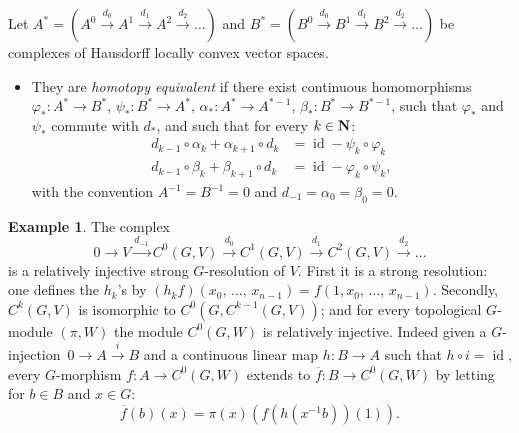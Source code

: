 \documentclass[11pt]{article}
\theoremstyle{definition}
\newtheorem{exam}[theo]{Example}
\numberwithin{equation}{section}
\numberwithin{figure}{section}
\numberwithin{table}{section}
\DeclareMathOperator{\idm}{id}
\begin{document}
Let $A^* = (A^0 \stackrel{d_0}{\to} A^1 \stackrel{d_1}{\to} A^2 \stackrel{d_2}{\to}\dots)$ and $B^* = (B^0 \stackrel{d_0}{\to} B^1 \stackrel{d_1}{\to} B^2 \stackrel{d_2}{\to}\dots)$ be complexes of Hausdorff locally convex vector spaces.
\begin{itemize}
\item They are \emph{homotopy equivalent} if there exist continuous homomorphisms $\varphi_* : A^*\to B^*$, $\psi_* : B^* \to A^*$, $\alpha_* : A^* \to A^{*-1}$, $\beta_* : B^* \to B^{*-1}$, such that $\varphi_*$ and $\psi_*$ commute with $d_*$, and such that for every $k \in {\bf N}$:
\begin{align*}
d_{k-1} \circ \alpha_k + \alpha_{k+1} \circ d_k &= \idm - \psi_k \circ \varphi_k\\
d _{k-1}\circ \beta_k + \beta_{k+1} \circ d_k &= \idm - \varphi_k \circ \psi_k,
\end{align*}
with the convention $A^{-1} = B^{-1} = 0$ and $d_{-1} = \alpha _0 = \beta _0 = 0$.
\end{itemize}

\begin{exam}\label{bar_ex}
The complex
\[
0 \to V \stackrel{d_{-1}}{\to} C^0(G,V) \stackrel{d_0}{\to} C^1(G,V) \stackrel{d_1}{\to} C^2(G,V) \stackrel{d_2}{\to}\dots
\]
is a relatively injective strong $G$-resolution of $V$. First it is a strong resolution: one defines the $h_k$'s by $(h_k f) (x_0,\,\dots,\,x_{n-1}) = f(1, x_0,\,\dots,\,x_{n-1})$. Secondly, $C^k(G, V)$ is isomorphic to $C^0(G, C^{k-1} (G,V))$; and for every topological $G$-module $(\pi, W)$ the module $C^0(G, W)$ is relatively injective. Indeed given a $G$-injection~$0 \to A \stackrel{i}{\to} B$ and a continuous linear map $h: B \to A$ such that $h \circ i = \idm$, every $G$-morphism $f: A \to C^0(G, W)$ extends to $\overline{f}: B \to C^0(G, W)$ by letting for $b \in B$ and $x \in G$:
\[
\overline{f} (b)(x) = \pi (x) \left(f\left(h(x^{-1}b)\right)(1)\right).
\]
\end{exam}
\end{document}
